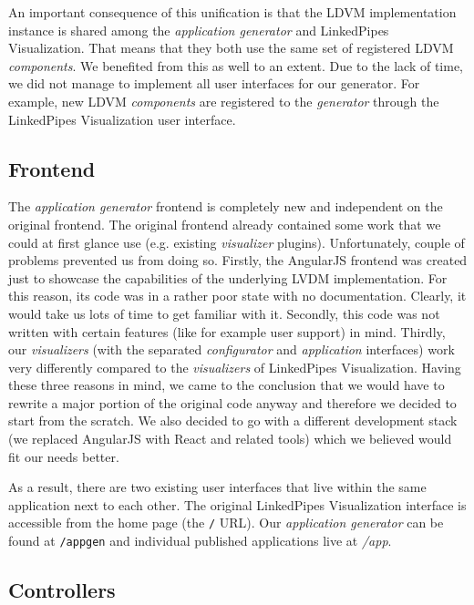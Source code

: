 An important consequence of this unification is that the LDVM implementation instance is shared among the \emph{application generator} and LinkedPipes Visualization. That means that they both use the same set of registered LDVM \emph{components}. We benefited from this as well to an extent. Due to the lack of time, we did not manage to implement all user interfaces for our generator. For example, new LDVM \emph{components} are registered to the \emph{generator} through the LinkedPipes Visualization user interface.

\subsection{Frontend}

The \emph{application generator} frontend is completely new and independent on the original frontend. The original frontend already contained some work that we could at first glance use (e.g. existing \emph{visualizer} plugins). Unfortunately, couple of problems prevented us from doing so. Firstly, the AngularJS frontend was created just to showcase the capabilities of the underlying LVDM implementation. For this reason, its code was in a rather poor state with no documentation. Clearly, it would take us lots of time to get familiar with it. Secondly, this code was not written with certain features (like for example user support) in mind. Thirdly, our \emph{visualizers} (with the separated \emph{configurator} and \emph{application} interfaces) work very differently compared to the \emph{visualizers} of LinkedPipes Visualization. Having these three reasons in mind, we came to the conclusion that we would have to rewrite a major portion of the original code anyway and therefore we decided to start from the scratch. We also decided to go with a different development stack (we replaced AngularJS with React and related tools) which we believed would fit our needs better. 

As a result, there are two existing user interfaces that live within the same application next to each other. The original LinkedPipes Visualization interface is accessible from the home page (the \texttt{/} URL). Our \emph{application generator} can be found at \texttt{/appgen} and individual published applications live at \emph{/app}.

\subsection{Controllers}

